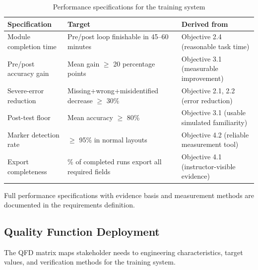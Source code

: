 \documentclass[10pt,a4paper]{article}
\begin{document}
\begin{table}[H]
\centering
\caption{Performance specifications for the training system}
\label{tab:preliminary-performance-specifications}
\small\renewcommand{\arraystretch}{1.2}\setlength{\tabcolsep}{4pt}
\begin{tabularx}{\textwidth}{|>{\raggedright\arraybackslash}X|>{\raggedright\arraybackslash}X|>{\raggedright\arraybackslash}X|}
\hline
Specification & Target & Derived from \\
\hline
Module completion time & Pre/post loop finishable in 45--60 minutes & Objective 2.4 (reasonable task time) \\
\hline
Pre/post accuracy gain & Mean gain $\ge$ 20 percentage points & Objective 3.1 (measurable improvement) \\
\hline
Severe-error reduction & Missing+wrong+misidentified decrease $\ge$ 30\% & Objective 2.1, 2.2 (error reduction) \\
\hline
Post-test floor & Mean accuracy $\ge$ 80\% & Objective 3.1 (usable simulated familiarity) \\
\hline
Marker detection rate & $\ge$ 95\% in normal layouts & Objective 4.2 (reliable measurement tool) \\
\hline
Export completeness & 100\% of completed runs export all required fields & Objective 4.1 (instructor-visible evidence) \\
\hline
\end{tabularx}
\end{table}

Full performance specifications with evidence basis and measurement methods are
documented in the requirements definition.

\subsection{Quality Function Deployment}
\label{sec:quality-function-deployment-preliminary}

The QFD matrix maps stakeholder needs to engineering characteristics, target
values, and verification methods for the training system.
\end{document}
